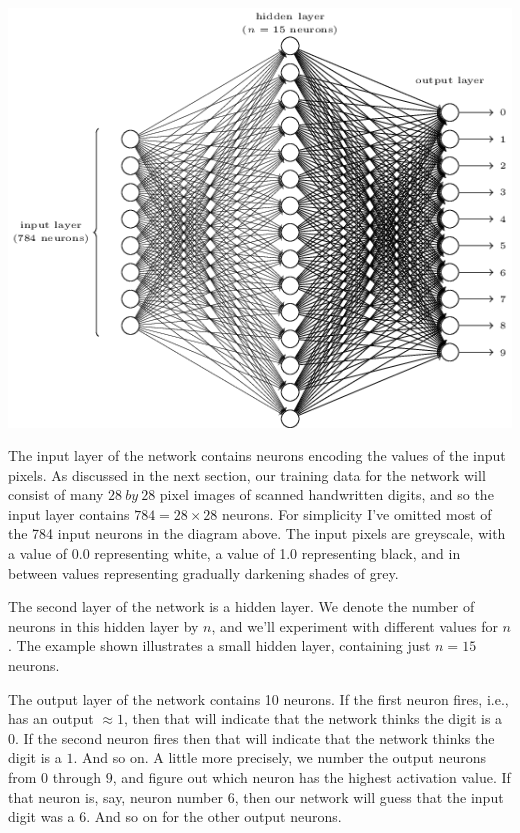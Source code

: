 \documentclass[a4paper,12pt]{report}%
\begin{document}
\begin{center}
 \includegraphics[width=0.85\linewidth]{images/tikz12.png}
\end{center}

The input layer of the network contains neurons encoding the values of the input pixels. As discussed in the next section, our training data for the network will consist of many $28~by~28$ pixel images of scanned handwritten digits, and so the input layer contains $784=28\times28$ neurons. For simplicity I've omitted most of the 784 input neurons in the diagram above. The input pixels are greyscale, with a value of 0.0 representing white, a value of 1.0 representing black, and in between values representing gradually darkening shades of grey.

The second layer of the network is a hidden layer. We denote the number of neurons in this hidden layer by $n$, and we'll experiment with different values for $n$. The example shown illustrates a small hidden layer, containing just $n=15$ neurons.

The output layer of the network contains 10 neurons. If the first neuron fires, i.e., has an output $ ≈ 1 $, then that will indicate that the network thinks the digit is a $0$. If the second neuron fires then that will indicate that the network thinks the digit is a $1$. And so on. A little more precisely, we number the output neurons from $0$ through $9$, and figure out which neuron has the highest activation value. If that neuron is, say, neuron number $6$, then our network will guess that the input digit was a $6$. And so on for the other output neurons.
\end{document}
